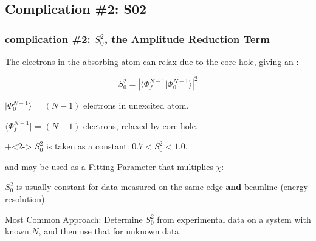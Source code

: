 \subsection{{\feff} Complication \#2: S02}
\begin{frame} \frametitle{{\feff} complication \#2: $S_0^2$, the  Amplitude Reduction Term}

  \vmm
    \begin{cenpage}{110mm}

  The {} electrons in the absorbing atom can relax due to
  the core-hole, giving an {}:

   \vmm
   \[
   S_0^2 =  {  |{\langle \Phi^{N-1}_f |\Phi^{N-1}_0 \rangle}|^2}
   \]

    \vspace{1mm}

    ${| \Phi^{N-1}_0 \rangle }$ = $(N-1)$ electrons in unexcited atom.

    ${\langle \Phi^{N-1}_f|}$   = $(N-1)$ electrons, relaxed by core-hole.

    \vmm

    \onslide+<2->
    ${S_0^2}$ is taken as a constant: \hspace{3mm}  $ 0.7 < S_0^2 < 1.0 $.

    and may be used as a Fitting Parameter that multiplies {$\chi$}:

    \vmm \vmm
    \begin{center}
      {}
    \end{center}


    \begin{postitbox}{68mm}
      $S_0^2$ is usually constant for  data measured on
      the same edge {\bf{and}} beamline (energy resolution).
    \end{postitbox}

    Most Common Approach: Determine $S_0^2$ from experimental data on a
    system with known $N$, and then use that for unknown data. 

    \vmm

    \end{cenpage}

\end{frame}

